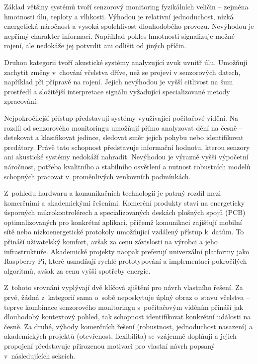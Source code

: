 Základ většiny systémů tvoří senzorový monitoring fyzikálních veličin -- zejména hmotnosti úlu, teploty a vlhkosti. Výhodou je relativní jednoduchost, nízká energetická náročnost a vysoká spolehlivost dlouhodobého provozu. Nevýhodou je nepřímý charakter informací. Například pokles hmotnosti signalizuje možné rojení, ale nedokáže jej potvrdit ani odlišit od jiných příčin.

Druhou kategorii tvoří akustické systémy analyzující zvuk uvnitř úlu. Umožňují zachytit změny v~chování včelstva dříve, než  se projeví v senzorových datech, například při přípravě na rojení. Jejich nevýhodou je vyšší citlivost na šum prostředí a složitější interpretace signálu vyžadující specializované metody zpracování. 

Nejpokročilejší přístup představují systémy využívající počítačové vidění. Na rozdíl od senzorového monitoringu umožňují přímo analyzovat dění na česně -- detekovat a klasifikovat jedince, sledovat směr jejich pohybu nebo identifikovat predátory. Právě tato schopnost představuje informační hodnotu, kterou senzory ani akustické systémy nedokáží nahradit. Nevýhodou je výrazně vyšší výpočetní náročnost, potřeba kvalitního a stabilního osvětlení a nutnost robustních modelů schopných pracovat v~proměnlivých venkovních podmínkách.

Z~pohledu hardwaru a komunikačních technologií je patrný rozdíl mezi komerčními a akademickými řešeními. Komerční produkty staví na energeticky úsporných mikrokontrolérech a specializovaných deskách plošných spojů (PCB) optimalizovaných pro konkrétní aplikaci, přičemž komunikaci zajišťují mobilní sítě nebo nízkoenergetické protokoly umožňující vzdálený přístup k~datům. To přináší uživatelský komfort, avšak za cenu závislosti na výrobci a jeho infrastruktuře. Akademické projekty naopak preferují univerzální platformy jako Raspberry Pi, které usnadňují rychlé prototypování a implementaci pokročilých algoritmů, avšak za cenu vyšší spotřeby energie.

Z~tohoto srovnání vyplývají dvě klíčová zjištění pro návrh vlastního řešení. Za prvé, žádná z~kategorií sama o~sobě neposkytuje úplný obraz o~stavu včelstva -- teprve kombinace senzorového monitoringu s~počítačovým viděním přináší jak dlouhodobý kontextový pohled, tak schopnost identifikovat konkrétní události na česně. Za druhé, výhody komerčních řešení (robustnost, jednoduchost nasazení) a akademických projektů (otevřenost, flexibilita) se vzájemně doplňují a jejich propojení představuje přirozenou motivaci pro vlastní návrh popsaný v~následujících sekcích.

